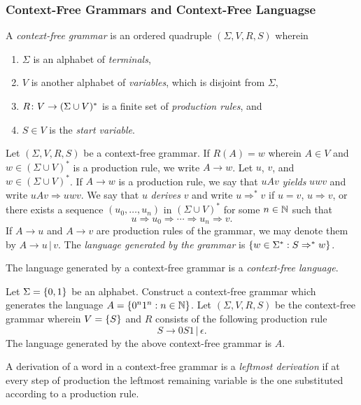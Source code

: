 \subsubsection{Context-Free Grammars and Context-Free Languagse}

\Bdf
    A \emph{context-free grammar} is an ordered quadruple \((\Sigma, V, R, S)\)
    wherein
    \begin{enumerate}
        \item \(\Sigma\) is an alphabet of \emph{terminals},
        \item \(V\) is another alphabet of \emph{variables}, which is disjoint
        from \(\Sigma\),
        \item \(R\colon V\to(\Sigma \cup V)^*\) is a finite set of \emph{production rules}, and
        \item \(S \in V\) is the \emph{start variable}.
    \end{enumerate}
\Edf

Let \((\Sigma, V, R, S)\) be a context-free grammar. If \(R(A) = w\) wherein \(A
\in V\) and \(w \in (\Sigma \cup V)^*\) is a production rule, we write \(A \to
w\). Let \(u\), \(v\), and \(w \in (\Sigma \cup V)^*\). If \(A \to w\) is a
production rule, we say that \(u A v\) \emph{yields} \(u w v\) and write \(u A v
\Rightarrow u w v\). We say that \(u\) \emph{derives} \(v\) and write \(u
\Rightarrow^* v\) if \(u = v\), \(u \Rightarrow v\), or there exists a sequence
\((u_0, \ldots, u_n)\) in \((\Sigma \cup V)^*\) for some \(n \in \mathbb{N}\) such
that
\[
    u \Rightarrow u_0 \Rightarrow \cdots \Rightarrow u_n \Rightarrow v.
\]
If \(A \to u\) and \(A \to v\) are production rules of the grammar, we may
denote them by \(A \to u \, | \, v\). The \emph{language generated by the
grammar} is \(\{w \in \Sigma^* : S \Rightarrow^* w\}\).

The language generated by a context-free grammar is a \emph{context-free
language}.

\Bxr
    Let \(\Sigma = \{0, 1\}\) be an alphabet. Construct a context-free grammar
    which generates the language \(A = \{0^n 1^n : n \in \mathbb{N}\}\).
\Exr
\Bsl
    Let \((\Sigma, V, R, S)\) be the context-free grammar wherein \(V =
    \{S\}\) and \(R\) consists of the following production rule
    \[
        S \to 0 S 1 \, | \, \epsilon.
    \]
    The language generated by the above context-free grammar is \(A\).
\Esl

A derivation of a word in a context-free grammar is a \emph{leftmost derivation}
if at every step of production the leftmost remaining variable is the one
substituted according to a production rule.

